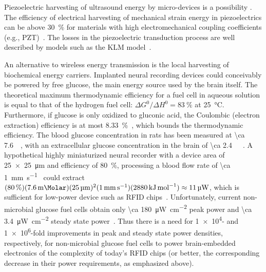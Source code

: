 Piezoelectric harvesting of ultrasound energy by micro-devices is a possibility \cite{Seo2013}. The efficiency of electrical harvesting of mechanical strain energy in piezoelectrics can be above \SI{30}{\percent} for materials with high electromechanical coupling coefficients (e.g., PZT)~\cite{safari08, xu12}. The losses in the piezoelectric transduction process are well described by models such as the KLM model~\cite{krimholtz70,castillo03}. 

An alternative to wireless energy transmission is the local harvesting of biochemical energy carriers. Implanted neural recording devices could conceivably be powered by free glucose, the main energy source used by the brain itself.
The theoretical maximum thermodynamic efficiency for a fuel cell in aqueous solution is equal to that of the hydrogen fuel cell: $\Delta G^0/\Delta H^0 = \SI{83}{\percent}$ at \SI{25}{\degreeCelsius}.
Furthermore, if glucose is only oxidized to gluconic acid, the Coulombic (electron extraction) efficiency is at most \SI{8.33}{\percent}~\cite{rapoport12}, which bounds the thermodynamic efficiency.
The blood glucose concentration in rats has been measured at \SI{\ca 7.6}{\milli\Molar}, with an extracellular glucose concentration in the brain of \SI{\ca 2.4}{\milli\Molar}~\cite{silver94}.
A hypothetical highly miniaturized neural recorder with a device area of \SI{25 x 25}{\micro\meter} and efficiency of \SI{80}{\percent}, processing a blood flow rate of \SI{\ca 1}{\milli\meter\per\second}~\cite{ivanov81} could extract $(\SI{80}{\percent})(\SI{7.6}{\milli\Molar})(\SI{25}{\micro\meter})^2(\SI{1}{\milli\meter\per\second})(\SI{2880}{\kilo\joule\per\mole})\approx \SI{11}{\micro\watt}$, which is sufficient for low-power device such as RFID chips~\cite{cho05}.
Unfortunately, current non-microbial glucose fuel cells obtain only \SI{\ca 180}{\micro\watt\per\centi\meter\squared} peak power and \SI{\ca 3.4}{\micro\watt\per\centi\meter\squared} steady state power~\cite{rapoport12}.
Thus there is a need for \num{1e4}- and \num{1e6}-fold improvements in peak and steady state power densities, respectively, for non-microbial glucose fuel cells to power brain-embedded electronics of the complexity of today's RFID chips (or better, the corresponding decrease in their power requirements, as emphasized above).

